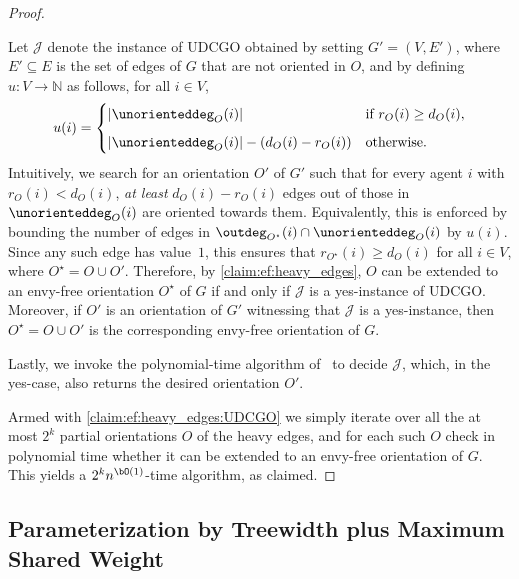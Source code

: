 \documentclass[11pt,letterpaper]{article}
\begin{document}
\begin{proof}
\begin{nestedproof}
        Let $\mathcal{J}$ denote the instance of UDCGO obtained by setting $G' = (V, E')$,
        where $E' \subseteq E$ is the set of edges of $G$ that are not oriented in $O$,
        and by defining $u \colon V \to \mathbb{N}$ as follows, for all $i \in V$,
        \[
            u(i) =
            \begin{cases}
                |\unorienteddeg_O(i)|
                    & \text{if } r_O(i) \ge d_O(i),\\[2mm]
                |\unorienteddeg_O(i)| - (d_O(i) - r_O(i))
                    & \text{otherwise.}
            \end{cases}
        \]
        Intuitively, we search for an orientation $O'$ of $G'$ such that for every agent $i$ with $r_O(i) < d_O(i)$,
        \emph{at least} $d_O(i) - r_O(i)$ edges out of those in $\unorienteddeg_O(i)$ are oriented towards them.
        Equivalently, this is enforced by bounding the number of edges in $\outdeg_{O^\star}(i) \cap \unorienteddeg_O(i)$ by $u(i)$.
        Since any such edge has value~$1$, this ensures that
        $r_{O^\star}(i) \ge d_O(i)$ for all $i \in V$, where $O^\star = O \cup O'$.
        Therefore, by \cref{claim:ef:heavy_edges},
        $O$ can be extended to an envy-free orientation $O^\star$ of $G$ if and only if $\mathcal{J}$ is a yes-instance of UDCGO.
        Moreover, if $O'$ is an orientation of $G'$ witnessing that $\mathcal{J}$ is a yes-instance,
        then $O^\star = O \cup O'$ is the corresponding envy-free orientation of $G$.

        Lastly, we invoke the polynomial-time algorithm of~\cite[Theorem~1]{FrankGyarfas1978} to decide $\mathcal{J}$,
        which, in the yes-case, also returns the desired orientation $O'$.
    \end{nestedproof}
    Armed with \cref{claim:ef:heavy_edges:UDCGO} we simply iterate over all the at most $2^k$ partial orientations $O$ of the heavy edges,
    and for each such $O$ check in polynomial time whether it can be extended to an envy-free orientation of $G$.
    This yields a $2^k n^{\bO(1)}$-time algorithm, as claimed.
\end{proof}

\subsection{Parameterization by Treewidth plus Maximum Shared Weight}\label{subsec:EFo_shared_weight}
\end{document}
